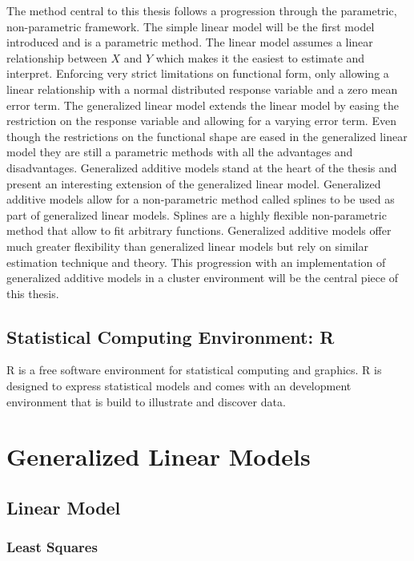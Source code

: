 \documentclass{article}
\begin{document}
    The method central to this thesis follows a progression through the parametric, non-parametric framework. The simple linear model will be the first model introduced and is a parametric method. The linear model assumes a linear relationship between $X$ and $Y$ which makes it the easiest to estimate and interpret. Enforcing very strict limitations on functional form, only allowing a linear relationship with a normal distributed response variable and a zero mean error term. The generalized linear model extends the linear model by easing the restriction on the response variable and allowing for a varying error term. Even though the restrictions on the functional shape are eased in the generalized linear model they are still a parametric methods with all the advantages and disadvantages. Generalized additive models stand at the heart of the thesis and present an interesting extension of the generalized linear model. Generalized additive models allow for a non-parametric method called splines to be used as part of generalized linear models. Splines are a highly flexible non-parametric method that allow to fit arbitrary functions. Generalized additive models offer much greater flexibility than generalized linear models but rely on similar estimation technique and theory. This progression with an implementation of generalized additive models in a cluster environment will be the central piece of this thesis.
    
    
    \subsection{Statistical Computing Environment: R}
        
    R is a free software environment for statistical computing and graphics. R is designed to express statistical models and comes with an development environment that is build to illustrate and discover data.   
        
    
    
    \section{Generalized Linear Models}
        \subsection{Linear Model}
        \subsubsection{Least Squares}
\end{document}
